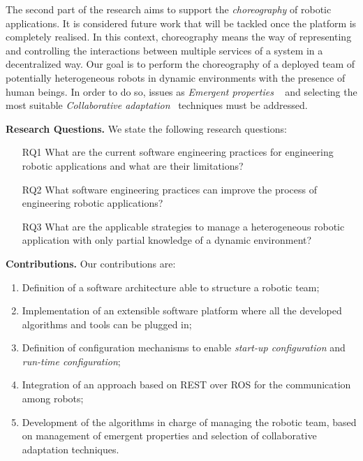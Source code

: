 The second part of the research aims to support the \emph{choreography} of robotic applications.
It is considered future work that will be tackled once the platform is completely realised.
In this context, choreography means the way of representing and controlling the interactions between multiple services of a system in a decentralized way.
Our goal is to perform the choreography of a deployed team of potentially heterogeneous robots in dynamic environments with the presence of human beings.
In order to do so, issues as \emph{Emergent properties} ~\cite{DeAngelis2016} and selecting the most suitable \emph{Collaborative adaptation}~\cite{Yan2013} techniques must be addressed.

\noindent \textbf{Research Questions.} 
We state the following research questions:
\begin{itemize}
\item[RQ1] What are the current software engineering practices for engineering robotic applications and what are their limitations?
\item[RQ2] What software engineering practices can improve the process of engineering robotic applications?
\item[RQ3] What are the applicable strategies to manage a heterogeneous robotic application with only partial knowledge of a dynamic environment?
\end{itemize}

\noindent \textbf{Contributions.} 
Our contributions are:

\begin{enumerate}
\item Definition of a software architecture able to structure a robotic team;
\item Implementation of an extensible software platform where all the developed algorithms and tools can be plugged in;
\item Definition of configuration mechanisms to enable \emph{start-up configuration} and \emph{run-time configuration};
\item Integration of an approach based on REST over ROS for the communication among robots;
\item Development of the algorithms in charge of managing the robotic team, based on management of emergent properties and selection of collaborative adaptation techniques.
\end{enumerate}

